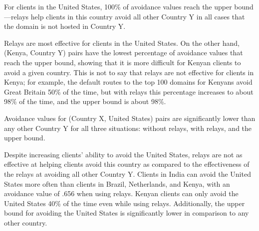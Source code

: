 \begin{finding}
For clients in the United States, 100\% of avoidance values reach the upper bound---relays help clients in this country avoid all other Country Y in all cases that the domain is not hosted in Country Y.  
\end{finding}
Relays are most effective for clients in the United States.  On the other hand, (Kenya, Country Y) pairs have the lowest percentage of avoidance values that reach the upper bound, showing that it is more difficult for Kenyan clients to avoid a given country.  This is not to say that relays are not effective for clients in Kenya; for example, the default routes to the top 100 domains for Kenyans avoid Great Britain 50\% of the time, but with relays this percentage increases to about 98\% of the time, and the upper bound is about 98\%. 

\begin{finding}
Avoidance values for (Country X, United States) pairs are significantly lower than any other Country Y for all three situations: without relays, with relays, and the upper bound. 
\end{finding}

Despite increasing clients' ability to avoid the United States, relays are not as effective at helping clients avoid this country as compared to the effectiveness of the relays at avoiding all other Country Y.  Clients in India can avoid the United States more often than clients in Brazil, Netherlands, and Kenya, with an avoidance value of .656 when using relays.  Kenyan clients can only avoid the United States 40\% of the time even while using relays.  Additionally, the upper bound for avoiding the United States is significantly lower in comparison to any other country.  

